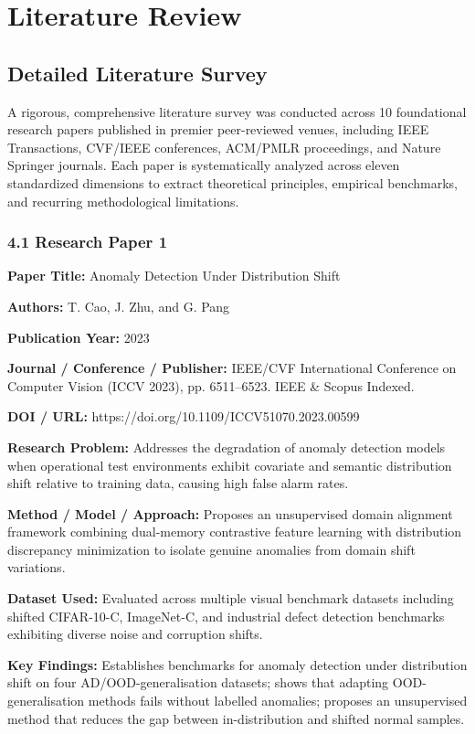 \chapter{Literature Review}

\section{Detailed Literature Survey}

A rigorous, comprehensive literature survey was conducted across 10 foundational research papers published in premier peer-reviewed venues, including IEEE Transactions, CVF/IEEE conferences, ACM/PMLR proceedings, and Nature Springer journals. Each paper is systematically analyzed across eleven standardized dimensions to extract theoretical principles, empirical benchmarks, and recurring methodological limitations.

\subsection{4.1 Research Paper 1}

\textbf{Paper Title:} Anomaly Detection Under Distribution Shift

\textbf{Authors:} T. Cao, J. Zhu, and G. Pang

\textbf{Publication Year:} 2023

\textbf{Journal / Conference / Publisher:} IEEE/CVF International Conference on Computer Vision (ICCV 2023), pp. 6511--6523. IEEE \& Scopus Indexed.

\textbf{DOI / URL:} https://doi.org/10.1109/ICCV51070.2023.00599

\textbf{Research Problem:} Addresses the degradation of anomaly detection models when operational test environments exhibit covariate and semantic distribution shift relative to training data, causing high false alarm rates.

\textbf{Method / Model / Approach:} Proposes an unsupervised domain alignment framework combining dual-memory contrastive feature learning with distribution discrepancy minimization to isolate genuine anomalies from domain shift variations.

\textbf{Dataset Used:} Evaluated across multiple visual benchmark datasets including shifted CIFAR-10-C, ImageNet-C, and industrial defect detection benchmarks exhibiting diverse noise and corruption shifts.

\textbf{Key Findings:} Establishes benchmarks for anomaly detection under distribution shift on four AD/OOD-generalisation datasets; shows that adapting OOD-generalisation methods fails without labelled anomalies; proposes an unsupervised method that reduces the gap between in-distribution and shifted normal samples.

